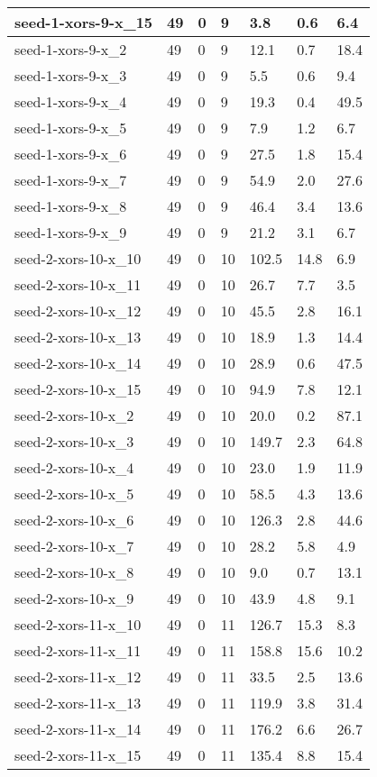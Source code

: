 \begin{scriptsize}
\begin{longtable}{|p{5cm}|l|l|l|l|l|l|}
seed-1-xors-9-x\_15&49&0&9&3.8&0.6&6.4 \\ \hline 
seed-1-xors-9-x\_2&49&0&9&12.1&0.7&18.4 \\ \hline 
seed-1-xors-9-x\_3&49&0&9&5.5&0.6&9.4 \\ \hline 
seed-1-xors-9-x\_4&49&0&9&19.3&0.4&49.5 \\ \hline 
seed-1-xors-9-x\_5&49&0&9&7.9&1.2&6.7 \\ \hline 
seed-1-xors-9-x\_6&49&0&9&27.5&1.8&15.4 \\ \hline 
seed-1-xors-9-x\_7&49&0&9&54.9&2.0&27.6 \\ \hline 
seed-1-xors-9-x\_8&49&0&9&46.4&3.4&13.6 \\ \hline 
seed-1-xors-9-x\_9&49&0&9&21.2&3.1&6.7 \\ \hline 
seed-2-xors-10-x\_10&49&0&10&102.5&14.8&6.9 \\ \hline 
seed-2-xors-10-x\_11&49&0&10&26.7&7.7&3.5 \\ \hline 
seed-2-xors-10-x\_12&49&0&10&45.5&2.8&16.1 \\ \hline 
seed-2-xors-10-x\_13&49&0&10&18.9&1.3&14.4 \\ \hline 
seed-2-xors-10-x\_14&49&0&10&28.9&0.6&47.5 \\ \hline 
seed-2-xors-10-x\_15&49&0&10&94.9&7.8&12.1 \\ \hline 
seed-2-xors-10-x\_2&49&0&10&20.0&0.2&87.1 \\ \hline 
seed-2-xors-10-x\_3&49&0&10&149.7&2.3&64.8 \\ \hline 
seed-2-xors-10-x\_4&49&0&10&23.0&1.9&11.9 \\ \hline 
seed-2-xors-10-x\_5&49&0&10&58.5&4.3&13.6 \\ \hline 
seed-2-xors-10-x\_6&49&0&10&126.3&2.8&44.6 \\ \hline 
seed-2-xors-10-x\_7&49&0&10&28.2&5.8&4.9 \\ \hline 
seed-2-xors-10-x\_8&49&0&10&9.0&0.7&13.1 \\ \hline 
seed-2-xors-10-x\_9&49&0&10&43.9&4.8&9.1 \\ \hline 
seed-2-xors-11-x\_10&49&0&11&126.7&15.3&8.3 \\ \hline 
seed-2-xors-11-x\_11&49&0&11&158.8&15.6&10.2 \\ \hline 
seed-2-xors-11-x\_12&49&0&11&33.5&2.5&13.6 \\ \hline 
seed-2-xors-11-x\_13&49&0&11&119.9&3.8&31.4 \\ \hline 
seed-2-xors-11-x\_14&49&0&11&176.2&6.6&26.7 \\ \hline 
seed-2-xors-11-x\_15&49&0&11&135.4&8.8&15.4 \\ \hline 

\end{longtable}
\end{scriptsize}

